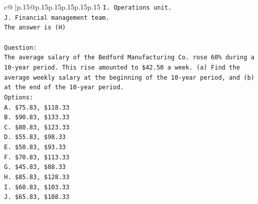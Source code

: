 \documentclass{article}
\begin{document}
{\begin{supertabular}{c@{$\;$}|p{.15\linewidth}@{}p{.15\linewidth}p{.15\linewidth}p{.15\linewidth}p{.15\linewidth}p{.15\linewidth}}
{{{\texttt{I. Operations unit.} \\
\texttt{J. Financial management team.} \\
\texttt{The answer is (H)} \\
\\ 
\texttt{Question:} \\
\texttt{The average salary of the Bedford Manufacturing Co. rose 60\% during a 10{-}year period. This rise amounted to \$42.50 a week. (a) Find the average weekly salary at the beginning of the 10{-}year period, and (b) at the end of the 10{-}year period.} \\
\texttt{Options:} \\
\texttt{A. \$75.83, \$118.33} \\
\texttt{B. \$90.83, \$133.33} \\
\texttt{C. \$80.83, \$123.33} \\
\texttt{D. \$55.83, \$98.33} \\
\texttt{E. \$50.83, \$93.33} \\
\texttt{F. \$70.83, \$113.33} \\
\texttt{G. \$45.83, \$88.33} \\
\texttt{H. \$85.83, \$128.33} \\
\texttt{I. \$60.83, \$103.33} \\
\texttt{J. \$65.83, \$108.33} \\
            }
        }
    }
     \\ \\


\end{supertabular}}
\end{document}

